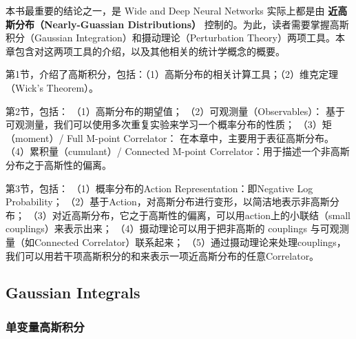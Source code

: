 本书最重要的结论之一，是 Wide and Deep Neural Networks 实际上都是由 \textbf{近高斯分布（Nearly-Guassian Distributions）} 控制的。为此，读者需要掌握高斯积分（Gaussian Integration）和摄动理论（Perturbation Theory）两项工具。本章包含对这两项工具的介绍，以及其他相关的统计学概念的概要。


第1节，介绍了高斯积分，包括：（1）高斯分布的相关计算工具；（2）维克定理（Wick's Theorem）。


第2节，包括：
（1）高斯分布的期望值；
（2）可观测量（Observables）：
 基于可观测量，我们可以使用多次重复实验来学习一个概率分布的性质；
（3）矩（moment）/ Full M-point Correlator： 在本章中，主要用于表征高斯分布。
（4）累积量（cumulant）/ Connected M-point Correlator：用于描述一个非高斯分布之于高斯性的偏离。



第3节，包括：
（1）概率分布的Action Representation：即Negative Log Probability；
（2）基于Action，对高斯分布进行变形，以简洁地表示非高斯分布；
（3）对近高斯分布，它之于高斯性的偏离，可以用action上的小联结（small couplings）来表示出来；
（4）摄动理论可以用于把非高斯的 couplings 与可观测量（如Connected Correlator）联系起来；
（5）通过摄动理论来处理couplings，我们可以用若干项高斯积分的和来表示一项近高斯分布的任意Correlator。

\subsection{Gaussian Integrals}
\subsubsection{单变量高斯积分}

